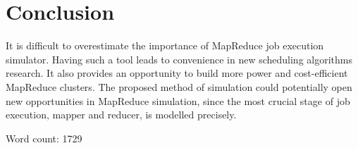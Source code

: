 \documentclass[conference]{IEEEtran} \IEEEoverridecommandlockouts
\begin{document}
    \section{Conclusion}

    It is difficult to overestimate the importance of MapReduce job execution
    simulator.  Having such a tool leads to convenience in new scheduling
    algorithms research. It also provides an opportunity to build more power
    and cost-efficient MapReduce clusters. The proposed method of simulation
    could potentially open new opportunities in MapReduce simulation, since the
    most crucial stage of job execution, mapper and reducer, is modelled
    precisely. 


    
    \printbibliography

    \vspace{10 mm}

    \begin{flushright}
        Word count: 1729
    \end{flushright}
\end{document}
